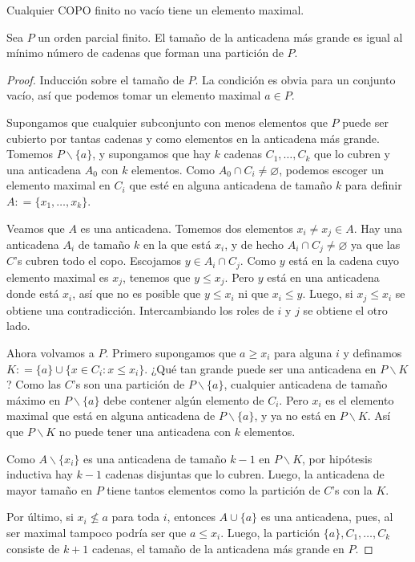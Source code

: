 \begin{lemma}
\label{lemma-combi-002}
Cualquier COPO finito no vacío tiene un
elemento maximal.
\end{lemma}
\begin{theorem}[Dilworth, 1950]
\label{theorem-combi-011}
Sea $P$ un orden parcial finito. El tamaño de
la anticadena más grande es igual al mínimo
número de cadenas que forman una partición de
$P$.
\end{theorem}
\begin{proof}
Inducción sobre el tamaño de $P$. La
condición es obvia para un conjunto vacío,
así que podemos tomar un elemento maximal
$a\in P$.

Supongamos que cualquier subconjunto con
menos elementos que $P$ puede ser cubierto
por tantas cadenas y como elementos en la
anticadena más grande. Tomemos
$P\backslash\{a\}$, y supongamos que hay $k$
cadenas $C_1, \ldots,C_k$ que lo cubren y una
anticadena $A_0$ con $k$ elementos. Como
$A_0\cap C_i\neq\varnothing$, podemos escoger
un elemento maximal en $C_i$ que esté en
alguna anticadena de tamaño $k$ para definir
$A: = \{x_1, \ldots,x_k\}$.

Veamos que $A$ es una anticadena. Tomemos dos
elementos $x_i\neq x_j\in A$. Hay una
anticadena $A_i$ de tamaño $k$ en la que está
$x_i$, y de hecho $A_i\cap
C_j\neq\varnothing$ ya que las $C$'s cubren
todo el copo. Escojamos $y\in A_i\cap C_j$.
Como $y$ está en la cadena cuyo elemento
maximal es $x_j$, tenemos que $y\leq x_j$.
Pero $y$ está en una anticadena donde está
$x_i$, así que no es posible que $y\leq x_i$
ni que $x_i\leq y$. Luego, si $x_j\leq x_i$
se obtiene una contradicción. Intercambiando
los roles de $i$ y $j$ se obtiene el otro
lado.

Ahora volvamos a $P$. Primero supongamos que
$a\geq x_i$ para alguna $i$ y definamos $K: =
\{a\}\cup\{x\in C_i:x\leq x_i\}$. ¿Qué tan
grande puede ser una anticadena en
$P\backslash K$? Como las $C$'s son una
partición de $P\backslash\{a\}$, cualquier
anticadena de tamaño máximo en
$P\backslash\{a\}$ debe contener algún
elemento de $C_i$. Pero $x_i$ es el elemento
maximal que está en alguna anticadena de
$P\backslash\{a\}$, y ya no está en
$P\backslash K$. Así que $P\backslash K$ no
puede tener una anticadena con $k$ elementos.

Como $A\backslash\{x_i\}$ es una anticadena
de tamaño $k-1$ en $P\backslash K$, por
hipótesis inductiva hay $k-1$ cadenas
disjuntas que lo cubren. Luego, la anticadena
de mayor tamaño en $P$ tiene tantos elementos
como la partición de $C$'s con la $K$.

Por último, si $x_i\not\leq a$ para toda $i$,
entonces $A\cup \{a\}$ es una anticadena,
pues, al ser maximal tampoco podría ser que
$a\leq x_i$. Luego, la partición $\{a\},C_1,
\ldots,C_k$ consiste de $k + 1$ cadenas, el
tamaño de la anticadena más grande en $P$.
\end{proof}
